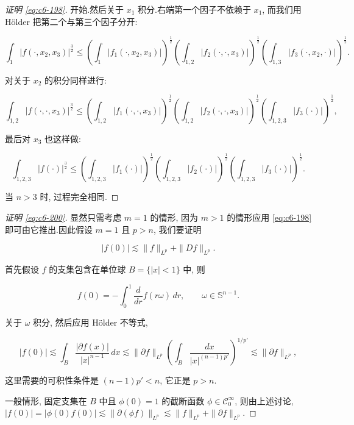 \begin{proof}[证明 \eqref{eq:c6-198}]
开始.然后关于 $x_1$ 积分.右端第一个因子不依赖于 $x_1$, 而我们用 Hölder 把第二个与第三个因子分开:

\[
\int_1|f(\cdot, x_2, x_3)|^{\frac{3}{2}} \le \left(\int_1|f_1(\cdot, x_2, x_3)|\right)^{\frac{1}{2}}\left(\int_{1, 2}|f_2(\cdot, \cdot, x_3)|\right)^{\frac{1}{2}}\left(\int_{1, 3}|f_3(\cdot, x_2, \cdot)|\right)^{\frac{1}{2}}.
\]

对关于 $x_2$ 的积分同样进行:

\[
\int_{1, 2}|f(\cdot, \cdot, x_3)|^{\frac{3}{2}} \le \left(\int_{1, 2}|f_1(\cdot, \cdot, x_3)|\right)^{\frac{1}{2}}\left(\int_{1, 2}|f_2(\cdot, \cdot, x_3)|\right)^{\frac{1}{2}}\left(\int_{1, 2, 3}|f_3(\cdot)|\right)^{\frac{1}{2}},
\]

最后对 $x_3$ 也这样做:

\[
\int_{1, 2, 3}|f(\cdot)|^{\frac{3}{2}} \le \left(\int_{1, 2, 3}|f_1(\cdot)|\right)^{\frac{1}{2}}\left(\int_{1, 2, 3}|f_2(\cdot)|\right)^{\frac{1}{2}}\left(\int_{1, 2, 3}|f_3(\cdot)|\right)^{\frac{1}{2}}.
\]

当 $n>3$ 时, 过程完全相同.
\end{proof}

\begin{proof}[证明 \eqref{eq:c6-200}]
显然只需考虑 $m=1$ 的情形, 因为 $m>1$ 的情形应用 \eqref{eq:c6-198} 即可由它推出.因此假设 $m=1$ 且 $p>n$, 我们要证明

\[
|f(0)| \lesssim \|f\|_{L^p} + \|Df\|_{L^p}.
\]

首先假设 $f$ 的支集包含在单位球 $B = \{|x|<1\}$ 中, 则

\begin{equation}
f(0) = -\int_0^1\frac{d}{dr}f(r\omega)\, dr, \qquad \omega\in\mathbb{S}^{n-1}.\label{eq:c6-203}
\end{equation}

关于 $\omega$ 积分, 然后应用 Hölder 不等式,

\begin{equation}
|f(0)| \lesssim \int_B\frac{|\partial f(x)|}{|x|^{n-1}}\, dx \lesssim \|\partial f\|_{L^p}\left(\int_B\frac{dx}{|x|^{(n-1)p'}}\right)^{1/p'} \lesssim \|\partial f\|_{L^p}, \label{eq:c6-204}
\end{equation}

这里需要的可积性条件是 $(n-1)p'<n$, 它正是 $p>n$.

一般情形, 固定支集在 $B$ 中且 $\phi(0)=1$ 的截断函数 $\phi\in\mathcal{C}_0^\infty$, 则由上述讨论, $|f(0)| = |\phi(0)f(0)| \lesssim \|\partial(\phi f)\|_{L^p} \lesssim \|f\|_{L^p} + \|\partial f\|_{L^p}$.
\end{proof}

